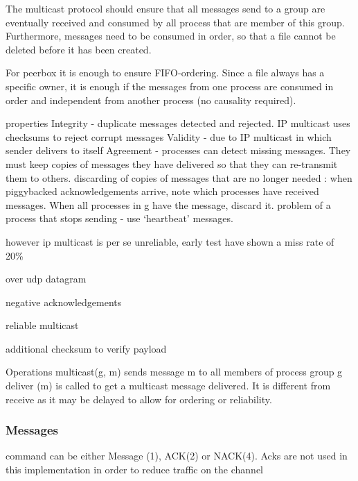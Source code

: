 The multicast protocol should ensure that all messages send to a group are eventually received and consumed by all process that are member of this group. Furthermore, messages need to be consumed in order, so that a file cannot be deleted before it has been created. 

For peerbox it is enough to ensure FIFO-ordering. Since a file always has a specific owner, it is enough if the messages from one process are consumed in order and independent from another process (no causality required). 






properties
Integrity - duplicate messages detected and rejected.
IP multicast uses checksums to reject corrupt messages
Validity - due to IP multicast in which sender delivers to 
itself
Agreement - processes can detect missing messages. 
They must keep copies of messages they have 
delivered so that they can re-transmit them to others.
discarding of copies of messages that are no longer 
needed : 
when piggybacked acknowledgements arrive, note which processes 
have received messages. When all processes in g have the message, 
discard it.
problem of a process that stops sending - use ‘heartbeat’ messages.

however ip multicast is per se unreliable, early test have shown a miss rate of 20\%

over udp datagram

negative acknowledgements

reliable multicast

additional checksum to verify payload

Operations 
multicast(g, m) sends message m to all members of process group g
deliver (m) is called to get a multicast message delivered. It is different 
from receive as it may be delayed to allow for ordering or reliability.

\subsubsection{Messages}


command can be either Message (1), ACK(2) or NACK(4). 
Acks are not used in this implementation in order to reduce traffic on the channel 

